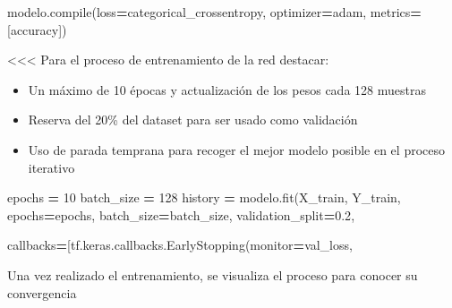 \documentclass[
  a4paper,
  DIV=11,
  numbers=noendperiod]{scrreprt}
\newenvironment{Shaded}{\begin{snugshade}}{\end{snugshade}}
\newcommand{\BuiltInTok}[1]{#1}
\newcommand{\DecValTok}[1]{\textcolor[rgb]{0.00,0.00,0.81}{#1}}
\newcommand{\FloatTok}[1]{\textcolor[rgb]{0.00,0.00,0.81}{#1}}
\newcommand{\NormalTok}[1]{#1}
\newcommand{\OperatorTok}[1]{\textcolor[rgb]{0.81,0.36,0.00}{\textbf{#1}}}
\newcommand{\StringTok}[1]{\textcolor[rgb]{0.31,0.60,0.02}{#1}}
\providecommand{\tightlist}{%
  \setlength{\itemsep}{0pt}\setlength{\parskip}{0pt}}\usepackage{longtable,booktabs,array}
\begin{document}
\begin{Shaded}
\begin{Highlighting}[numbers=left,,]
\NormalTok{modelo.}\BuiltInTok{compile}\NormalTok{(loss}\OperatorTok{=}\StringTok{\textquotesingle{}categorical\_crossentropy\textquotesingle{}}\NormalTok{, optimizer}\OperatorTok{=}\StringTok{\textquotesingle{}adam\textquotesingle{}}\NormalTok{,}
\NormalTok{metrics}\OperatorTok{=}\NormalTok{[}\StringTok{\textquotesingle{}accuracy\textquotesingle{}}\NormalTok{])}
\end{Highlighting}
\end{Shaded}

\textless\textless\textless{} Para el proceso de entrenamiento de la red
destacar:

\begin{itemize}
\tightlist
\item
  Un máximo de 10 épocas y actualización de los pesos cada 128 muestras
\item
  Reserva del 20\% del dataset para ser usado como validación
\item
  Uso de parada temprana para recoger el mejor modelo posible en el
  proceso iterativo
\end{itemize}

\begin{Shaded}
\begin{Highlighting}[numbers=left,,]
\NormalTok{epochs }\OperatorTok{=} \DecValTok{10}
\NormalTok{batch\_size }\OperatorTok{=} \DecValTok{128}
\NormalTok{history }\OperatorTok{=}\NormalTok{ modelo.fit(X\_train, Y\_train,}
\NormalTok{epochs}\OperatorTok{=}\NormalTok{epochs,}
\NormalTok{batch\_size}\OperatorTok{=}\NormalTok{batch\_size,}
\NormalTok{validation\_split}\OperatorTok{=}\FloatTok{0.2}\NormalTok{,}

\NormalTok{callbacks}\OperatorTok{=}\NormalTok{[tf.keras.callbacks.EarlyStopping(monitor}\OperatorTok{=}\StringTok{\textquotesingle{}val\_loss\textquotesingle{}}\NormalTok{,}
\end{Highlighting}
\end{Shaded}

Una vez realizado el entrenamiento, se visualiza el proceso para conocer
su convergencia
\end{document}
